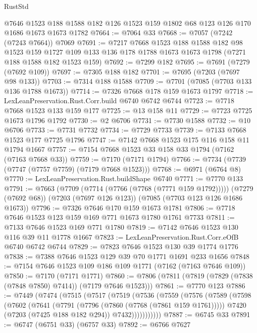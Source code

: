 \begin{lexlean}{RustStd}
\begin{coremodule}
    @7646
    @1523
    @188
    @1588
    @182
    @126
    @1523
    @159
    @1802
    @68
    @123
    @126
    @170
    @1686
    @1673
    @1673
    @1782
@7664 := @7064 @33
@7668 := @7057 (@7242 (@7243 @7664)) @7069
@7691 := @7217
    @7668
    @1523
    @188
    @1588
    @182
    @98
    @1523
    @159
    @1727
    @109
    @133
    @136
    @178
    @1788
    @1673
    @1673
    @1798
    (@7271 @188 @1588 @182 @1523 @159)
@7692 := @7299 @182
@7695 := @7691 (@7279 (@7692 @109))
@7697 := @7305 @188 @182
@7701 := @7695 (@7203 (@7697 @98 @133))
@7703 := @7314 @188 @1588
@7709 := @7701 (@7085 (@7703 @133 @136 @1788 @1673))
@7714 := @7326 @7668 @178 @159 @1673 @1797
@7718 := LexLeanPreservation.Rust.Corr.build @6740 @6742 @6744
@7723 := @7718 @7668 @1523 @133 @159 @177
@7725 := @13 @158 @11
@7729 := @7723 @7725 @1673 @1796 @1792
@7730 := @2 @6706
@7731 := @7730 @1588
@7732 := @10 @6706
@7733 := @7731 @7732
@7734 := @7729 @7733
@7739 := @7133 @7668 @1523 @177 @7725 @1796
@7747 := @7142 @7668 @1523 @175 @116 @158 @11 @1794 @1667
@7757 := @7154 @7668 @1523 @33 @158 @33 @1794 (@7162 (@7163 @7668 @33))
@7759 := @7170 (@7171 @1794)
@7766 := @7734 (@7739 (@7747 (@7757 @7759) (@7179 @7668 @1523)))
@7768 := @6971 (@6764 @8)
@7770 := LexLeanPreservation.Rust.buildShape @6740
@7771 := @7770 @133
@7791 := @7663
    (@7709 (@7714 (@7766 (@7768 (@7771 @159 @1792)))))
    (@7279 (@7692 @68))
    (@7203 (@7697 @126 @123))
    (@7085 (@7703 @123 @126 @1686 @1673))
@7796 := @7326 @7646 @170 @159 @1673 @1781
@7806 := @7718 @7646 @1523 @123 @159 @169 @771 @1673 @1780 @1761 @7733
@7811 := @7133 @7646 @1523 @169 @771 @1780
@7819 := @7142 @7646 @1523 @130 @116 @39 @11 @1778 @1667
@7823 := LexLeanPreservation.Rust.Corr.eOfB @6740 @6742 @6744
@7829 := @7823 @7646 @1523 @130 @39 @1774 @1776
@7838 := @7388 @7646 @1523 @129 @39 @70 @1771 @1691 @233 @1656
@7848 := @7154 @7646 @1523 @109 @186 @109 @1771 (@7162 (@7163 @7646 @109))
@7850 := @7170 (@7171 @1771)
@7860 := @7806 (@7811 (@7819 (@7829 (@7838 (@7848 @7850) @7414)) (@7179 @7646 @1523)))
@7861 := @7770 @123
@7886 := @7449
    (@7474
      (@7515
        (@7517
          (@7519
            (@7536
              (@7559
                (@7576
                  (@7589
                    (@7598
                      (@7602
                        (@7641
                          (@7791 (@7796 (@7860 (@7768 (@7861 @159 @1761)))))
                          @7420
                          (@7203 (@7425 @188 @182 @294))
                          @7432)))))))))))
@7887 := @6745 @33
@7891 := @6747 (@6751 @33) (@6757 @33)
@7892 := @6766 @7627

\end{coremodule}
\end{lexlean}
